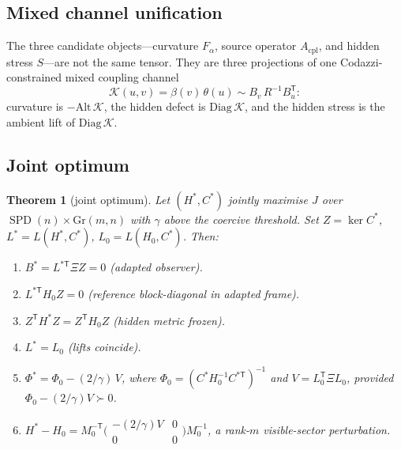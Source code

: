 \documentclass[11pt,a4paper]{article}
\numberwithin{equation}{section}
\theoremstyle{thmcompact}
\newtheorem{theorem}{Theorem}[section]
\theoremstyle{remark}
\begin{document}
\subsection*{Mixed channel unification}

The three candidate objects---curvature $F_\alpha$, source operator $A_{\mathrm{cpl}}$, and hidden stress $S$---are not the same tensor.  They are three projections of one Codazzi-constrained mixed coupling channel
\[
\mathcal K(u,v)=\beta(v)\,\theta(u)\sim B_v\,R^{-1}B_u^{\mathsf T}:
\]
curvature is $-\mathrm{Alt}\,\mathcal K$, the hidden defect is $\mathrm{Diag}\,\mathcal K$, and the hidden stress is the ambient lift of $\mathrm{Diag}\,\mathcal K$.

\subsection*{Joint optimum}

\begin{theorem}[joint optimum]\label{thm:joint-optimum}
Let $(H^*,C^*)$ jointly maximise $J$ over $\operatorname{SPD}(n)\times\mathrm{Gr}(m,n)$ with $\gamma$ above the coercive threshold.  Set $Z=\ker C^*$, $L^*=L(H^*,C^*)$, $L_0=L(H_0,C^*)$.  Then:
\begin{enumerate}
\item[\textup{(a)}] $B^*=L^{*\mathsf T}\Xi Z=0$ \textup{(adapted observer)}.
\item[\textup{(b)}] $L^{*\mathsf T}H_0 Z=0$ \textup{(reference block-diagonal in adapted frame)}.
\item[\textup{(c)}] $Z^{\mathsf T}H^*Z=Z^{\mathsf T}H_0 Z$ \textup{(hidden metric frozen)}.
\item[\textup{(d)}] $L^*=L_0$ \textup{(lifts coincide)}.
\item[\textup{(e)}] $\Phi^*=\Phi_0-(2/\gamma)\,V$, where $\Phi_0=(C^*H_0^{-1}C^{*\mathsf T})^{-1}$ and $V=L_0^{\mathsf T}\Xi L_0$, provided $\Phi_0-(2/\gamma)V\succ 0$.
\item[\textup{(f)}] $H^*-H_0=M_0^{-\mathsf T}\bigl(\begin{smallmatrix}-(2/\gamma)V&0\\0&0\end{smallmatrix}\bigr)M_0^{-1}$, a rank-$m$ visible-sector perturbation.
\end{enumerate}
\end{theorem}
\end{document}
